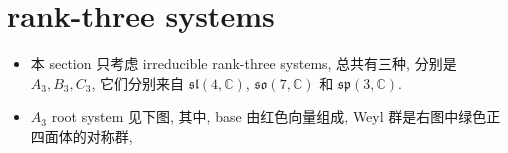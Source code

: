 \section{rank-three systems}
\begin{itemize}
	\item 本 section 只考虑 irreducible rank-three systems, 总共有三种, 分别是 $A_3, B_3, C_3$, 它们分别来自 $\mathfrak{sl}(4, \mathbb{C})$, $\mathfrak{so}(7, \mathbb{C})$ 和 $\mathfrak{sp}(3, \mathbb{C})$.
	
	\item $A_3$ root system 见下图, 其中, base 由红色向量组成, Weyl 群是右图中绿色正四面体的对称群,
	
	\begin{figure}[H]
		\centering
	\end{figure}
	

\end{itemize}
